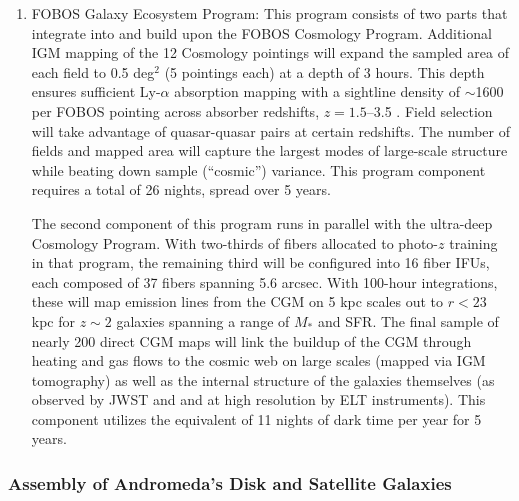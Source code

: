 \documentclass[oneside,11pt]{amsart}
\newcounter{chalno}
\newcommand{\chal}[1]{\refstepcounter{chalno}\label{#1}}
\begin{document}
\begin{enumerate}[rightmargin=0.2cm,leftmargin=0.2cm]
%
\chal{phot}
%
\item[] {\textsf {\large FOBOS Galaxy Ecosystem Program:}} This program consists of two parts that integrate into and build upon the FOBOS Cosmology Program.  Additional IGM mapping of the 12 Cosmology pointings will expand the sampled area of each field to 0.5 deg$^2$ (5 pointings each) at a depth of 3 hours.  This depth ensures sufficient Ly-$\alpha$ absorption mapping with a sightline density of $\sim$1600 per FOBOS pointing across absorber redshifts, $z = 1.5$--3.5 \citep[see][]{lee16}.  Field selection will take advantage of quasar-quasar pairs at certain redshifts.  The number of fields and mapped area will capture the largest modes of large-scale structure while beating down sample (``cosmic'') variance.  This program component requires a total of 26 nights, spread over 5 years.

The second component of this program runs in parallel with the ultra-deep Cosmology Program.  With two-thirds of fibers allocated to photo-$z$ training in that program, the remaining third will be configured into 16 fiber IFUs, each composed of 37 fibers spanning 5.6 arcsec.  With 100-hour integrations, these will map emission lines from the CGM on 5 kpc scales out to $r < 23$ kpc for $z \sim 2$ galaxies spanning a range of $M_*$ and SFR.  The final sample of nearly 200 direct CGM maps will link the buildup of the CGM through heating and gas flows to the cosmic web on large scales (mapped via IGM tomography) as well as the internal structure of the galaxies themselves (as observed by JWST and and at high resolution by ELT instruments).  This component utilizes the equivalent of 11 nights of dark time per year for 5 years.

%
\end{enumerate}


\subsubsection{Assembly of Andromeda's Disk and Satellite Galaxies}
\label{sec:localgroup}
\end{document}
